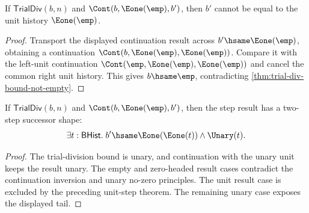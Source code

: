 \begin{theorem}
\label{thm:trialdiv-unit-step-result-not-unit}
If $\mathsf{TrialDiv}(b,n)$ and $\Cont(b,\Eone(\emp),b')$, then
$b'$ cannot be equal to the unit history $\Eone(\emp)$.
\end{theorem}
\begin{proof}
Transport the displayed continuation result across
$b'\hsame\Eone(\emp)$, obtaining a continuation
$\Cont(b,\Eone(\emp),\Eone(\emp))$. Compare it with the left-unit
continuation $\Cont(\emp,\Eone(\emp),\Eone(\emp))$ and cancel the common
right unit history. This gives $b\hsame\emp$, contradicting
\autoref{thm:trial-div-bound-not-empty}.
\end{proof}

\begin{theorem}
\label{thm:trialdiv-unit-step-result-successor-shape}
If $\mathsf{TrialDiv}(b,n)$ and $\Cont(b,\Eone(\emp),b')$, then the step
result has a two-step successor shape:
$$
\exists t:\mathsf{BHist}.\;
b'\hsame\Eone(\Eone(t))\wedge\Unary(t).
$$
\end{theorem}
\begin{proof}
The trial-division bound is unary, and continuation with the unary unit keeps
the result unary. The empty and zero-headed result cases contradict the
continuation inversion and unary no-zero principles. The unit result case is
excluded by the preceding unit-step theorem. The remaining unary case exposes
the displayed tail.
\end{proof}

